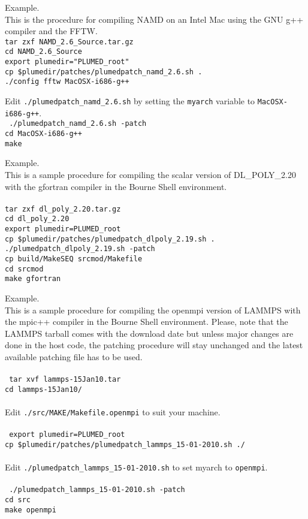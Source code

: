 \documentclass[12pt,fleqn]{report}
\newcommand{\esempio}[1]{
\vspace{10pt}
\begin{flushright}
\colorbox{light-gray}{
   \begin{minipage}{13cm}
       \scriptsize{
{\fontfamily{phv} \fontseries{b}
 \selectfont Example. \\
 \fontseries{m} \selectfont #1 } }
\end{minipage}}
\end{flushright}
\vspace{20pt}
}
\begin{document}
\esempio{This is the procedure for compiling NAMD on an Intel Mac using the GNU g++ compiler and the FFTW. \vspace{10pt} \\
{\tt tar zxf NAMD\_2.6\_Source.tar.gz \\
cd NAMD\_2.6\_Source \\
export plumedir="PLUMED\_root" \\
cp \$plumedir/patches/plumedpatch\_namd\_2.6.sh . \\
./config fftw MacOSX-i686-g++ \\
}

Edit {\tt ./plumedpatch\_namd\_2.6.sh} by setting the  {\tt myarch} variable to {\tt MacOSX-i686-g++}.\\ 

{\tt
./plumedpatch\_namd\_2.6.sh -patch\\
cd MacOSX-i686-g++ \\
make 
}
}

\esempio{
This is a sample procedure for compiling the scalar version of DL\_POLY\_2.20 with the gfortran compiler in the Bourne Shell environment.\\ \\

{\tt tar zxf dl\_poly\_2.20.tar.gz \\
cd dl\_poly\_2.20\\
export plumedir=PLUMED\_root\\
cp \$plumedir/patches/plumedpatch\_dlpoly\_2.19.sh . \\
./plumedpatch\_dlpoly\_2.19.sh -patch\\
cp build/MakeSEQ srcmod/Makefile\\
cd srcmod\\
make gfortran
}}

\esempio{
This is a sample procedure for compiling the openmpi version of LAMMPS with the mpic++ 
compiler in the Bourne Shell environment. Please, note that the LAMMPS tarball 
comes with the download date but unless major changes are done in the host code, the 
patching procedure will stay unchanged and the latest available patching file has to be 
used. \\ \\
{\tt
tar xvf lammps-15Jan10.tar \\
cd lammps-15Jan10/ \\
}
\\ Edit {\tt ./src/MAKE/Makefile.openmpi} to suit your machine. \\ \\
{\tt
export plumedir=PLUMED\_root \\
cp \${plumedir}/patches/plumedpatch\_lammps\_15-01-2010.sh ./ \\
}
\\ Edit {\tt ./plumedpatch\_lammps\_15-01-2010.sh} to set myarch to {\tt openmpi}. \\ \\
{\tt
./plumedpatch\_lammps\_15-01-2010.sh -patch \\
cd src \\
make openmpi \\
}
}
\end{document}
